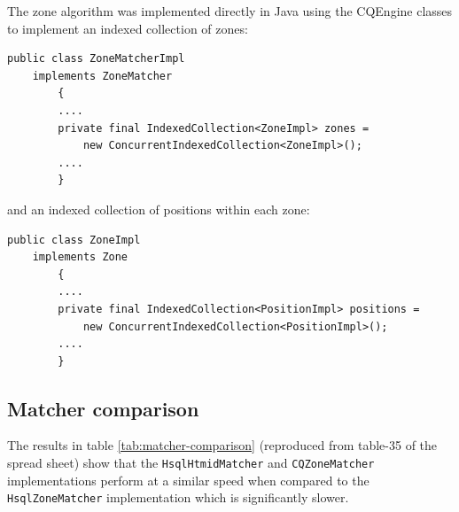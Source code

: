 \documentclass{article}
\newcommand{\cqengine} {CQEngine\xspace}
\begin{document}
The zone algorithm was implemented directly in Java using the \cqengine classes to implement an indexed collection of zones:

\begin{lstlisting}[style=Java]
    public class ZoneMatcherImpl
    implements ZoneMatcher
        {
        ....
        private final IndexedCollection<ZoneImpl> zones =
            new ConcurrentIndexedCollection<ZoneImpl>();
        ....
        }
\end{lstlisting}

and an indexed collection of positions within each zone:

\begin{lstlisting}[style=Java]
    public class ZoneImpl
    implements Zone
        {
        ....
        private final IndexedCollection<PositionImpl> positions =
            new ConcurrentIndexedCollection<PositionImpl>();
        ....
        }
\end{lstlisting}

\subsection{Matcher comparison}
\label{cqengine-indexing}

The results in table \ref{tab:matcher-comparison} (reproduced from table-35 of the spread sheet) show that the \texttt{HsqlHtmidMatcher} and \texttt{CQZoneMatcher} implementations 
perform at a similar speed when compared to the \texttt{HsqlZoneMatcher} implementation which is significantly slower.
\end{document}
